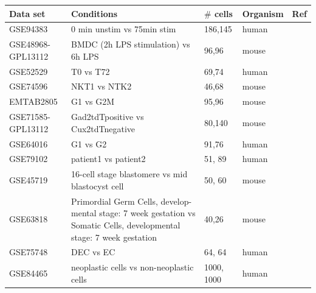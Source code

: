 \documentclass[aoas,preprint]{imsart}
\begin{document}
\begin{table}[b]
\tiny
\centering
\begin{tabular}{ |p{2cm}|p{5cm}|p{1.5cm}|p{1.5cm}|p{2cm}|}
\hline
 Data set & Conditions & $\#$ cells & Organism  & Ref \\ \hline \hline
GSE94383 & 0 min unstim vs 75min stim & 186,145 & human & \cite{Lane} \\ \hline
GSE48968-GPL13112 & BMDC (2h LPS stimulation) vs 6h LPS & 96,96 & mouse & \cite{Shalek} \\ \hline
GSE52529 & T0 vs T72 & 69,74 & human & \cite{Trapnell} \\ \hline
GSE74596 & NKT1 vs NTK2 & 46,68 & mouse & \cite{Engel} \\ \hline
EMTAB2805 & G1 vs G2M & 95,96 & mouse & \cite{EMTAB} \\ \hline
GSE71585-GPL13112 &Gad2tdTpositive vs Cux2tdTnegative  & 80,140 & mouse & \cite{Tasic} \\ \hline
GSE64016 & G1 vs G2 & 91,76 & human & \cite{oscope} \\ \hline
GSE79102 & patient1 vs patient2 & 51, 89 & human & \cite{sc3} \\ \hline
GSE45719 & 16-cell stage blastomere vs mid blastocyst cell & 50, 60 & mouse & \cite{Deng193} \\ \hline
GSE63818 & Primordial Germ Cells, develop- mental stage: 7 week gestation vs Somatic Cells, developmental stage: 7 week gestation & 40,26 & mouse & \cite{Guo} \\ \hline
GSE75748 & DEC vs EC & 64, 64 & human & \cite{chu} \\ \hline
GSE84465 & neoplastic cells vs non-neoplastic cells & 1000, 1000 & human & \cite{Darmanis} \\ \hline
\end{tabular}
\label{table:1}
\end{table}
\end{document}
